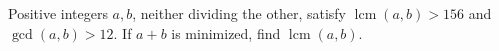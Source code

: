 Positive integers $a,b$, neither dividing the other, satisfy $\operatorname{lcm}(a,b)>156$ and $\gcd(a,b)>12$. If $a+b$ is minimized, find $\operatorname{lcm}(a,b)$.
